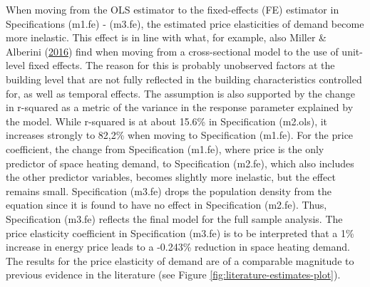 \documentclass[12pt,twoside]{reedthesis}
\begin{document}
When moving from the OLS estimator to the fixed-effects (FE) estimator in Specifications (m1.fe) - (m3.fe), the estimated price elasticities of demand become more inelastic. This effect is in line with what, for example, also Miller \& Alberini (\protect\hyperlink{ref-miller_alberini16}{2016}) find when moving from a cross-sectional model to the use of unit-level fixed effects. The reason for this is probably unobserved factors at the building level that are not fully reflected in the building characteristics controlled for, as well as temporal effects. The assumption is also supported by the change in r-squared as a metric of the variance in the response parameter explained by the model. While r-squared is at about 15.6\% in Specification (m2.ols), it increases strongly to 82,2\% when moving to Specification (m1.fe). For the price coefficient, the change from Specification (m1.fe), where price is the only predictor of space heating demand, to Specification (m2.fe), which also includes the other predictor variables, becomes slightly more inelastic, but the effect remains small. Specification (m3.fe) drops the population density from the equation since it is found to have no effect in Specification (m2.fe). Thus, Specification (m3.fe) reflects the final model for the full sample analysis. The price elasticity coefficient in Specification (m3.fe) is to be interpreted that a 1\% increase in energy price leads to a -0.243\% reduction in space heating demand. The results for the price elasticity of demand are of a comparable magnitude to previous evidence in the literature (see Figure \ref{fig:literature-estimates-plot}).
\end{document}
